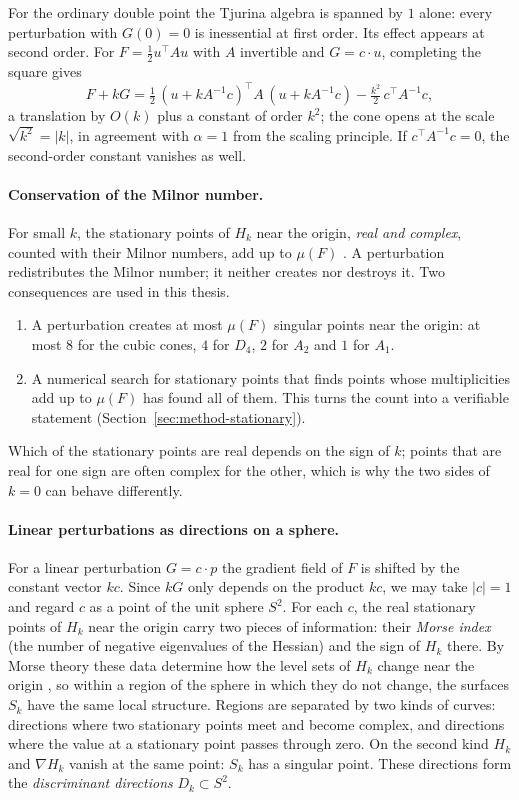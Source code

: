 For the ordinary double point the Tjurina algebra is spanned by $1$ alone:
every perturbation with $G(0)=0$ is inessential at first order. Its effect
appears at second order. For $F=\frac12u^{\top}Au$ with $A$ invertible and
$G=c\cdot u$, completing the square gives
\[
F+kG=\tfrac12\,(u+kA^{-1}c)^{\top}A\,(u+kA^{-1}c)-\tfrac{k^2}{2}\,c^{\top}A^{-1}c ,
\]
a translation by $O(k)$ plus a constant of order $k^2$; the cone opens at the
scale $\sqrt{k^2}=|k|$, in agreement with $\alpha=1$ from the scaling
principle. If $c^{\top}A^{-1}c=0$, the second-order constant vanishes as well.

\paragraph{Conservation of the Milnor number.}
For small $k$, the stationary points of $H_k$ near the origin, \emph{real and
complex}, counted with their Milnor numbers, add up to $\mu(F)$
\cite{milnor1968singular,greuel2007introduction}. A perturbation redistributes
the Milnor number; it neither creates nor destroys it. Two consequences are
used in this thesis.
\begin{enumerate}
    \item A perturbation creates at most $\mu(F)$ singular points near the
          origin: at most $8$ for the cubic cones, $4$ for $D_4$, $2$ for
          $A_2$ and $1$ for $A_1$.
    \item A numerical search for stationary points that finds points whose
          multiplicities add up to $\mu(F)$ has found all of them. This turns
          the count into a verifiable statement
          (Section~\ref{sec:method-stationary}).
\end{enumerate}
Which of the stationary points are real depends on the sign of $k$; points
that are real for one sign are often complex for the other, which is why the
two sides of $k=0$ can behave differently.

\paragraph{Linear perturbations as directions on a sphere.}
For a linear perturbation $G=c\cdot p$ the gradient field of $F$ is shifted
by the constant vector $kc$. Since $kG$ only depends on the product $kc$, we
may take $|c|=1$ and regard $c$ as a point of the unit sphere $S^2$. For each
$c$, the real stationary points of $H_k$ near the origin carry two pieces of
information: their \emph{Morse index} (the number of negative eigenvalues of
the Hessian) and the sign of $H_k$ there. By Morse theory these data determine
how the level sets of $H_k$ change near the origin \cite{milnor1963morse}, so
within a region of the sphere in which they do not change, the surfaces $S_k$
have the same local structure. Regions are separated by two kinds of curves:
directions where two stationary points meet and become complex, and
directions where the value at a stationary point passes through zero. On the
second kind $H_k$ and $\nabla H_k$ vanish at the same point: $S_k$ has a
singular point. These directions form the \emph{discriminant directions}
$D_k\subset S^2$.

